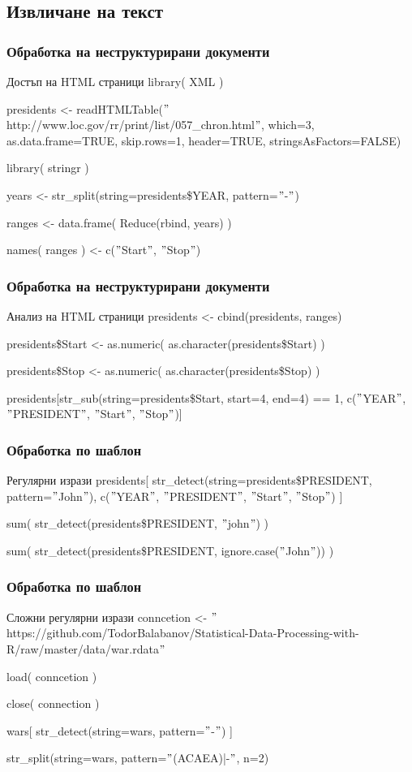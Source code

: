 \documentclass{beamer}
\begin{document}
\subsection{Извличане на текст}

\begin{frame}
\frametitle{Обработка на неструктурирани документи}
\begin{block}{Достъп на HTML страници}
library( XML )

presidents <- readHTMLTable($"$http://www.loc.gov/rr/print/list/057\_chron.html$"$, which=3, as.data.frame=TRUE, skip.rows=1, header=TRUE, stringsAsFactors=FALSE)

library( stringr )

years <- str\_split(string=presidents\$YEAR, pattern=$"$-$"$)

ranges <- data.frame( Reduce(rbind, years) )

names( ranges ) <- c($"$Start$"$, $"$Stop$"$)
\end{block}
\end{frame}

\begin{frame}
\frametitle{Обработка на неструктурирани документи}
\begin{block}{Анализ на HTML страници}
presidents <- cbind(presidents, ranges)

presidents\$Start <- as.numeric( as.character(presidents\$Start) )

presidents\$Stop <- as.numeric( as.character(presidents\$Stop) )

presidents[str\_sub(string=presidents\$Start, start=4, end=4) == 1, c($"$YEAR$"$, $"$PRESIDENT$"$, $"$Start$"$, $"$Stop$"$)]
\end{block}
\end{frame}

\begin{frame}
\frametitle{Обработка по шаблон}
\begin{block}{Регулярни изрази}
presidents[ str\_detect(string=presidents\$PRESIDENT, pattern=$"$John$"$), c($"$YEAR$"$, $"$PRESIDENT$"$, $"$Start$"$, $"$Stop$"$) ]

sum( str\_detect(presidents\$PRESIDENT, $"$john$"$) )

sum( str\_detect(presidents\$PRESIDENT, ignore.case($"$John$"$)) )
\end{block}
\end{frame}

\begin{frame}
\frametitle{Обработка по шаблон}
\begin{block}{Сложни регулярни изрази}
conncetion <- $"$https://github.com/TodorBalabanov/Statistical-Data-Processing-with-R/raw/master/data/war.rdata$"$

load( conncetion )

close( connection )

wars[ str\_detect(string=wars, pattern=$"$-$"$) ]

str\_split(string=wars, pattern=$"$(ACAEA)|-$"$, n=2)
\end{block}
\end{frame}
\end{document}
